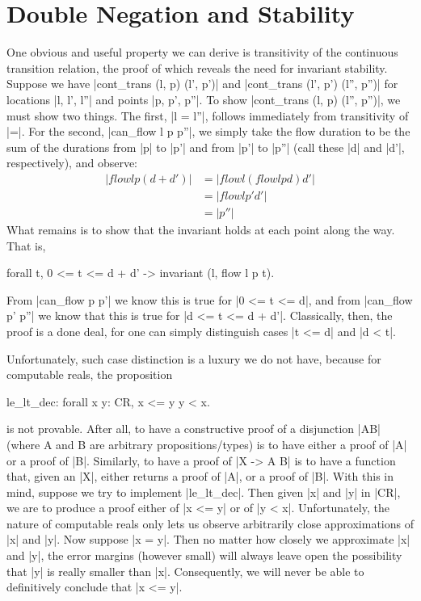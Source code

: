 \documentclass[runningheads]{llncs}
\begin{document}
\section{Double Negation and Stability}
\label{dn}


One obvious and useful property we can derive is transitivity of the continuous transition relation, the proof of which reveals the need for invariant stability. Suppose we have |cont_trans (l, p) (l', p')| and |cont_trans (l', p') (l'', p'')| for locations |l, l', l''| and points |p, p', p''|. To show |cont_trans (l, p) (l'', p'')|, we must show two things. The first, |l = l''|, follows immediately from transitivity of |=|. For the second, |can_flow l p p''|, we simply take the flow duration to be the sum of the durations from |p| to |p'| and from |p'| to |p''| (call these |d| and |d'|, respectively), and observe:
\begin{align}
  |flow l p (d + d')| & = |flow l (flow l p d) d'| \nonumber \\
    & = |flow l p' d'| \nonumber \\
    & = |p''| \nonumber
\end{align}
What remains is to show that the invariant holds at each point along the way. That is,
\begin{code}forall t, 0 <= t <= d + d' -> invariant (l, flow l p t).\end{code}
From |can_flow p p'| we know this is true for |0 <= t <= d|, and from |can_flow p' p''| we know that this is true for |d <= t <= d + d'|. Classically, then, the proof is a done deal, for one can simply distinguish cases |t <= d| and |d < t|.

Unfortunately, such case distinction is a luxury we do not have, because for computable reals, the proposition
\begin{code}
  le_lt_dec: forall x y: CR, x <= y \/ y < x.
\end{code}
is not provable. After all, to have a constructive proof of a disjunction |A\/B| (where A and B are arbitrary propositions/types) is to have either a proof of |A| or a proof of |B|. Similarly, to have a proof of |X -> A \/ B| is to have a function that, given an |X|, either returns a proof of |A|, or a proof of |B|. With this in mind, suppose we try to implement |le_lt_dec|. Then given |x| and |y| in |CR|, we are to produce a proof either of |x <= y| or of |y < x|. Unfortunately, the nature of computable reals only lets us observe arbitrarily close approximations of |x| and |y|. Now suppose |x = y|. Then no matter how closely we approximate |x| and |y|, the error margins (however small) will always leave open the possibility that |y| is really smaller than |x|. Consequently, we will never be able to definitively conclude that |x <= y|.
\end{document}
